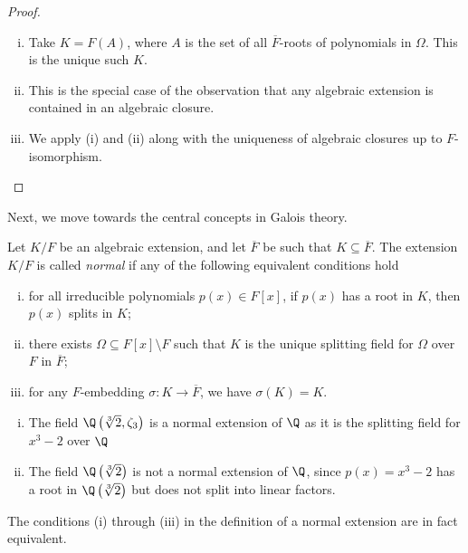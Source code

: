 \documentclass[10pt]{mypackage}
\begin{document}
\begin{proof}\hfill
  \begin{enumerate}[(i)]
    \item Take $K = F(A)$, where $A$ is the set of all $ \overline{F} $-roots of polynomials in $\Omega$. This is the unique such $K$.
    \item This is the special case of the observation that any algebraic extension is contained in an algebraic closure.
    \item We apply (i) and (ii) along with the uniqueness of algebraic closures up to $F$-isomorphism.
  \end{enumerate}
\end{proof}
Next, we move towards the central concepts in Galois theory.
\begin{definition}
  Let $K/F$ be an algebraic extension, and let $ \overline{F} $ be such that $K\subseteq \overline{F}$. The extension $K/F$ is called \textit{normal} if any of the following equivalent conditions hold
  \begin{enumerate}[(i)]
    \item for all irreducible polynomials $p(x)\in F[x]$, if $p(x)$ has a root in $K$, then $p(x)$ splits in $K$;
    \item there exists $\Omega\subseteq F[x]\setminus F$ such that $K$ is the unique splitting field for $\Omega$ over $F$ in $ \overline{F} $;
    \item for any $F$-embedding $\sigma\colon K\rightarrow \overline{F}$, we have $\sigma(K) = K$.
  \end{enumerate}
\end{definition}
\begin{example}\hfill
  \begin{enumerate}[(i)]
    \item The field $\Q\left( \sqrt[3]{2},\zeta_3 \right)$ is a normal extension of $\Q$ as it is the splitting field for $x^3-2$ over $\Q$
    \item The field $\Q\left( \sqrt[3]{2} \right)$ is not a normal extension of $\Q$, since $p(x) = x^3 - 2$ has a root in $\Q\left( \sqrt[3]{2} \right)$ but does not split into linear factors.
  \end{enumerate}
\end{example}
\begin{theorem}
  The conditions (i) through (iii) in the definition of a normal extension are in fact equivalent.
\end{theorem}
\end{document}
